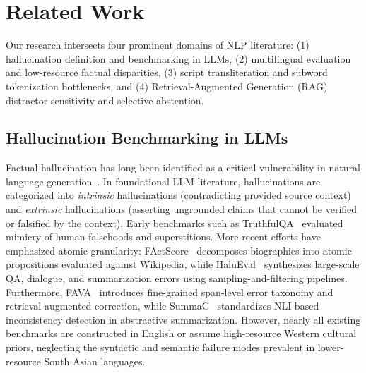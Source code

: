 \section{Related Work}
\label{sec:related_work}

Our research intersects four prominent domains of NLP literature: (1) hallucination definition and benchmarking in LLMs, (2) multilingual evaluation and low-resource factual disparities, (3) script transliteration and subword tokenization bottlenecks, and (4) Retrieval-Augmented Generation (RAG) distractor sensitivity and selective abstention.

\subsection{Hallucination Benchmarking in LLMs}
Factual hallucination has long been identified as a critical vulnerability in natural language generation~\citep{maynez2020faithfulness,ji2023survey}. In foundational LLM literature, hallucinations are categorized into \emph{intrinsic} hallucinations (contradicting provided source context) and \emph{extrinsic} hallucinations (asserting ungrounded claims that cannot be verified or falsified by the context). Early benchmarks such as TruthfulQA~\citep{lin2022truthfulqa} evaluated mimicry of human falsehoods and superstitions. More recent efforts have emphasized atomic granularity: FActScore~\citep{min2023factscore} decomposes biographies into atomic propositions evaluated against Wikipedia, while HaluEval~\citep{li2023halueval} synthesizes large-scale QA, dialogue, and summarization errors using sampling-and-filtering pipelines. Furthermore, FAVA~\citep{mishra2024fava} introduces fine-grained span-level error taxonomy and retrieval-augmented correction, while SummaC~\citep{laban2022summac} standardizes NLI-based inconsistency detection in abstractive summarization. However, nearly all existing benchmarks are constructed in English or assume high-resource Western cultural priors, neglecting the syntactic and semantic failure modes prevalent in lower-resource South Asian languages.

